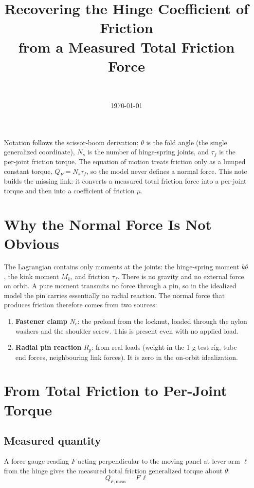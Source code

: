 \documentclass[11pt]{article}
\title{Recovering the Hinge Coefficient of Friction\\
\large from a Measured Total Friction Force}
\author{\Name\\ \course}
\date{\today}
\newcommand{\tauf}{\tau_f}
\newcommand{\Nc}{N_c}      %
\newcommand{\Rp}{R_p}      %
\begin{document}
\maketitle

\noindent
Notation follows the scissor-boom derivation: $\theta$ is the fold angle (the single generalized
coordinate), $N_s$ is the number of hinge-spring joints, and $\tauf$ is the per-joint friction
torque. The equation of motion treats friction only as a lumped constant torque,
$Q_F = N_s\tauf$, so the model never defines a normal force. This note builds the missing link: it
converts a measured total friction force into a per-joint torque and then into a coefficient of
friction $\mu$.

\section{Why the Normal Force Is Not Obvious}

The Lagrangian contains only moments at the joints: the hinge-spring moment $k\theta$, the kink
moment $M_k$, and friction $\tauf$. There is no gravity and no external force on orbit. A pure
moment transmits no force through a pin, so in the idealized model the pin carries essentially no
radial reaction. The normal force that produces friction therefore comes from two sources:
\begin{enumerate}[label=(\roman*)]
    \item \textbf{Fastener clamp} $\Nc$: the preload from the locknut, loaded through the nylon
    washers and the shoulder screw. This is present even with no applied load.
    \item \textbf{Radial pin reaction} $\Rp$: from real loads (weight in the 1-g test rig, tube end
    forces, neighbouring link forces). It is zero in the on-orbit idealization.
\end{enumerate}

\section{From Total Friction to Per-Joint Torque}

\subsection*{Measured quantity}

A force gauge reading $F$ acting perpendicular to the moving panel at lever arm $\ell$ from the
hinge gives the measured total friction generalized torque about $\theta$:
\begin{equation}
Q_{F,\text{meas}} = F\,\ell
\end{equation}
\end{document}
